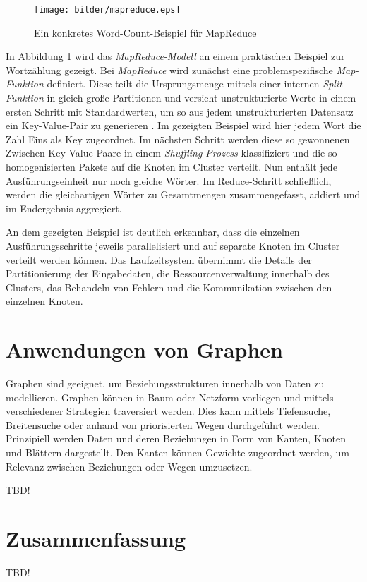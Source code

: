 \begin{figure}[htb!]
\centering
\texttt{[image: bilder/mapreduce.eps]}
\caption{Ein konkretes Word-Count-Beispiel für MapReduce}
\label{fig:wordcount}
\end{figure}   
 


In Abbildung \ref{fig:wordcount} wird das \textit{MapReduce-Modell} an einem praktischen Beispiel zur Wortzählung gezeigt. Bei \textit{MapReduce} wird zunächst eine problemspezifische \textit{Map-Funktion} definiert. Diese teilt die Ursprungsmenge mittels einer internen \textit{Split-Funktion} in gleich große Partitionen und versieht unstrukturierte Werte in einem ersten Schritt mit Standardwerten, um so aus jedem unstrukturierten Datensatz ein Key-Value-Pair zu generieren . Im gezeigten Beispiel wird hier jedem Wort die Zahl Eins als Key zugeordnet. Im nächsten Schritt werden diese so gewonnenen Zwischen-Key-Value-Paare in einem \textit{Shuffling-Prozess} klassifiziert und die so homogenisierten Pakete auf die Knoten im Cluster verteilt. Nun enthält jede Ausführungseinheit nur noch gleiche Wörter. Im Reduce-Schritt schließlich, werden die gleichartigen Wörter zu Gesamtmengen zusammengefasst, addiert und im Endergebnis aggregiert. 

An dem gezeigten Beispiel ist deutlich erkennbar, dass die einzelnen Ausführungsschritte jeweils parallelisiert und auf separate Knoten im Cluster verteilt werden können. Das Laufzeitsystem übernimmt die Details der Partitionierung der Eingabedaten, die Ressourcenverwaltung innerhalb des Clusters, das Behandeln von Fehlern und die Kommunikation zwischen den einzelnen Knoten. 
 


\section{Anwendungen von Graphen}
\label{section:anwendungen von graphen}

Graphen sind geeignet, um Beziehungsstrukturen innerhalb von Daten zu modellieren. Graphen können in Baum oder Netzform vorliegen und mittels verschiedener Strategien traversiert werden. Dies kann mittels Tiefensuche, Breitensuche oder anhand von priorisierten Wegen durchgeführt werden. Prinzipiell werden Daten und deren Beziehungen in Form von Kanten, Knoten und Blättern dargestellt. Den Kanten können Gewichte zugeordnet werden, um Relevanz zwischen Beziehungen oder Wegen umzusetzen. 

TBD!

\section{Zusammenfassung}
\label{section:streaming framworks}

TBD!
